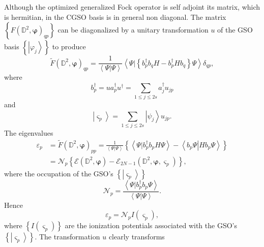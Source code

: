 \documentclass[aps,preprint]{revtex4}%
\begin{document}
Although the optimized generalized Fock operator is self adjoint its matrix,
which is hermitian, in the CGSO basis is in general non diagonal. The matrix
$\left\{  F\left(  \mathbb{D}^{2},\mathbf{\varphi}\right)  _{qp}\right\}  $
can be diagonalized by a unitary transformation $u$ of the GSO basis $\left\{
\left\vert \varphi_{j}\right\rangle \right\}  $ to produce
\begin{equation}
\tilde{F}\left(  \mathbb{D}^{2},\mathbf{\varphi}\right)  _{qp}=\frac
{1}{\left\langle \left.  \Psi\right\vert \Psi\right\rangle }\left\langle
\left.  \Psi\right\vert \left\{  b_{p}^{\dagger}b_{q}H-b_{p}^{\dagger}%
Hb_{q}\right\}  \Psi\right\rangle \delta_{qp},
\end{equation}
where
\begin{equation}
b_{p}^{\dagger}=ua_{p}^{\dagger}u^{\dagger}=\sum_{1\leq j\leq2s}a_{j}%
^{\dagger}u_{jp}%
\end{equation}
and
\begin{equation}
\left\vert \varsigma_{p}\right\rangle =\sum_{1\leq j\leq2s}\left\vert \psi
_{j}\right\rangle u_{jp}.
\end{equation}
The eigenvalues
\begin{align}
\varepsilon_{p} &  =\tilde{F}\left(  \mathbb{D}^{2},\mathbf{\varphi}\right)
_{pp}=\frac{1}{\left\langle \left.  \Psi\right\vert \Psi\right\rangle
}\left\{  \left\langle \left.  \Psi\right\vert b_{p}^{\dagger}b_{p}%
H\Psi\right\rangle -\left\langle \left.  b_{p}\Psi\right\vert Hb_{p}%
\Psi\right\rangle \right\}  \nonumber\\
&  =\mathcal{N}_{p}\left\{  \mathcal{E}\left(  \mathbb{D}^{2},\mathbf{\varphi
}\right)  -\mathcal{E}_{2N-1}\left(  \mathbb{D}^{2},\mathbf{\varphi,}%
\varsigma_{p}\right)  \right\}  ,
\end{align}
where the occupation of the GSO's $\left\{  \left\vert \varsigma
_{p}\right\rangle \right\}  $
\begin{equation}
\mathcal{N}_{p}=\frac{\left\langle \left.  \Psi\right\vert b_{p}^{\dagger
}b_{p}\Psi\right\rangle }{\left\langle \left.  \Psi\right\vert \Psi
\right\rangle }.
\end{equation}
Hence
\begin{equation}
\varepsilon_{p}=\mathcal{N}_{p}I\left(  \varsigma_{p}\right)  ,
\end{equation}
where $\left\{  I\left(  \varsigma_{p}\right)  \right\}  $ are the ionization
potentials associated with the GSO's $\left\{  \left\vert \varsigma
_{p}\right\rangle \right\}  .$ The transformation $u$ clearly transforms
\end{document}
